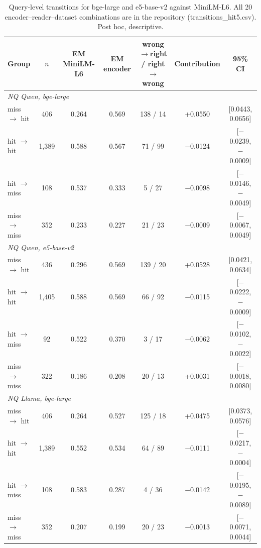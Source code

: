 \begin{table}[t]
\centering
\footnotesize
\caption{Query-level transitions for bge-large and e5-base-v2 against MiniLM-L6. All 20 encoder--reader--dataset combinations are in the repository (transitions\_hit5.csv). Post hoc, descriptive.}
\label{tab:transdetail}
\begin{tabular}{lcccccc}
\toprule
Group & $n$ & EM MiniLM-L6 & EM encoder & wrong$\to$right / right$\to$wrong & Contribution & 95\% CI \\
\midrule
\multicolumn{7}{l}{\emph{NQ Qwen, bge-large}} \\
\quad miss $\to$ hit & 406 & 0.264 & 0.569 & 138 / 14 & +0.0550 & [0.0443, 0.0656] \\
\quad hit $\to$ hit & 1,389 & 0.588 & 0.567 & 71 / 99 & \ensuremath{-}0.0124 & [\ensuremath{-}0.0239, \ensuremath{-}0.0009] \\
\quad hit $\to$ miss & 108 & 0.537 & 0.333 & 5 / 27 & \ensuremath{-}0.0098 & [\ensuremath{-}0.0146, \ensuremath{-}0.0049] \\
\quad miss $\to$ miss & 352 & 0.233 & 0.227 & 21 / 23 & \ensuremath{-}0.0009 & [\ensuremath{-}0.0067, 0.0049] \\
\multicolumn{7}{l}{\emph{NQ Qwen, e5-base-v2}} \\
\quad miss $\to$ hit & 436 & 0.296 & 0.569 & 139 / 20 & +0.0528 & [0.0421, 0.0634] \\
\quad hit $\to$ hit & 1,405 & 0.588 & 0.569 & 66 / 92 & \ensuremath{-}0.0115 & [\ensuremath{-}0.0222, \ensuremath{-}0.0009] \\
\quad hit $\to$ miss & 92 & 0.522 & 0.370 & 3 / 17 & \ensuremath{-}0.0062 & [\ensuremath{-}0.0102, \ensuremath{-}0.0022] \\
\quad miss $\to$ miss & 322 & 0.186 & 0.208 & 20 / 13 & +0.0031 & [\ensuremath{-}0.0018, 0.0080] \\
\multicolumn{7}{l}{\emph{NQ Llama, bge-large}} \\
\quad miss $\to$ hit & 406 & 0.264 & 0.527 & 125 / 18 & +0.0475 & [0.0373, 0.0576] \\
\quad hit $\to$ hit & 1,389 & 0.552 & 0.534 & 64 / 89 & \ensuremath{-}0.0111 & [\ensuremath{-}0.0217, \ensuremath{-}0.0004] \\
\quad hit $\to$ miss & 108 & 0.583 & 0.287 & 4 / 36 & \ensuremath{-}0.0142 & [\ensuremath{-}0.0195, \ensuremath{-}0.0089] \\
\quad miss $\to$ miss & 352 & 0.207 & 0.199 & 20 / 23 & \ensuremath{-}0.0013 & [\ensuremath{-}0.0071, 0.0044] \\

\end{tabular}
\end{table}
